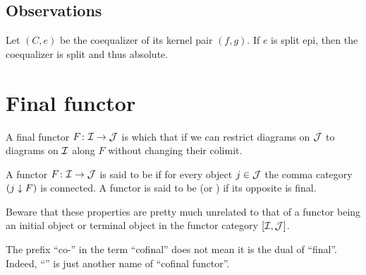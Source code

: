 \subsection{Observations}
\begin{exam}
  Let $(C,e)$ be the coequalizer of its kernel pair $(f,g)$. If $e$ is split epi, then the coequalizer is split and thus absolute.
\end{exam}


\newpage\section{Final functor}
A final functor $F \colon{\cal I}\to{\cal J}$ is which that if we can restrict diagrams on ${\cal J}$ to diagrams on ${\cal I}$ along $F$ without changing their colimit.

\begin{defn}
  A functor $F\colon{\cal I}\to{\cal J}$ is said to be  if for every object $j \in {\cal J}$ the comma category $(j\downarrow F)$ is connected.
  A functor is said to be  (or ) if its opposite is final.
\end{defn}
\begin{rem}
  Beware that these properties are pretty much unrelated to that of a functor being an initial object or terminal object in the functor category $[{\cal I},{\cal J}]$.
\end{rem}
\begin{rem}
  The prefix ``co-'' in the term ``cofinal'' does not mean it is the dual of ``final''. Indeed, ``'' is just another name of ``cofinal functor''.
\end{rem}

